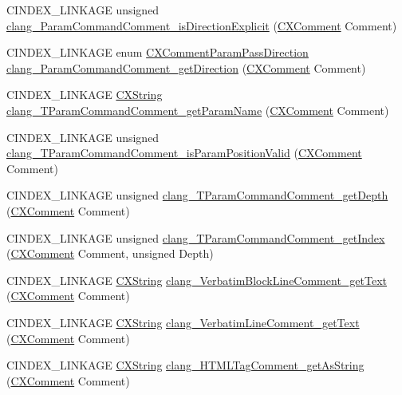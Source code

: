 \begin{DoxyCompactItemize}
\item 
C\+I\+N\+D\+E\+X\+\_\+\+L\+I\+N\+K\+A\+GE unsigned \hyperlink{group__CINDEX__COMMENT_gaf68f19e83ca9b27aec7eb22b065620bd}{clang\+\_\+\+Param\+Command\+Comment\+\_\+is\+Direction\+Explicit} (\hyperlink{structCXComment}{C\+X\+Comment} Comment)
\item 
C\+I\+N\+D\+E\+X\+\_\+\+L\+I\+N\+K\+A\+GE enum \hyperlink{group__CINDEX__COMMENT_gafadf6e52217ea74d1a014198df656ee1}{C\+X\+Comment\+Param\+Pass\+Direction} \hyperlink{group__CINDEX__COMMENT_gac78b84734e9e6040a001a0036e6aa15c}{clang\+\_\+\+Param\+Command\+Comment\+\_\+get\+Direction} (\hyperlink{structCXComment}{C\+X\+Comment} Comment)
\item 
C\+I\+N\+D\+E\+X\+\_\+\+L\+I\+N\+K\+A\+GE \hyperlink{structCXString}{C\+X\+String} \hyperlink{group__CINDEX__COMMENT_ga01f61f1d0dabcaf806eb1b9f21e5e340}{clang\+\_\+\+T\+Param\+Command\+Comment\+\_\+get\+Param\+Name} (\hyperlink{structCXComment}{C\+X\+Comment} Comment)
\item 
C\+I\+N\+D\+E\+X\+\_\+\+L\+I\+N\+K\+A\+GE unsigned \hyperlink{group__CINDEX__COMMENT_ga1f6e7538a646824f3dde65d634de753f}{clang\+\_\+\+T\+Param\+Command\+Comment\+\_\+is\+Param\+Position\+Valid} (\hyperlink{structCXComment}{C\+X\+Comment} Comment)
\item 
C\+I\+N\+D\+E\+X\+\_\+\+L\+I\+N\+K\+A\+GE unsigned \hyperlink{group__CINDEX__COMMENT_ga88371156eeeb768d0d14eb5630b7c726}{clang\+\_\+\+T\+Param\+Command\+Comment\+\_\+get\+Depth} (\hyperlink{structCXComment}{C\+X\+Comment} Comment)
\item 
C\+I\+N\+D\+E\+X\+\_\+\+L\+I\+N\+K\+A\+GE unsigned \hyperlink{group__CINDEX__COMMENT_ga0b91d26f02a476076b6dc5b5eea59a8f}{clang\+\_\+\+T\+Param\+Command\+Comment\+\_\+get\+Index} (\hyperlink{structCXComment}{C\+X\+Comment} Comment, unsigned Depth)
\item 
C\+I\+N\+D\+E\+X\+\_\+\+L\+I\+N\+K\+A\+GE \hyperlink{structCXString}{C\+X\+String} \hyperlink{group__CINDEX__COMMENT_ga599fad38a1c52917a2458ac10412969f}{clang\+\_\+\+Verbatim\+Block\+Line\+Comment\+\_\+get\+Text} (\hyperlink{structCXComment}{C\+X\+Comment} Comment)
\item 
C\+I\+N\+D\+E\+X\+\_\+\+L\+I\+N\+K\+A\+GE \hyperlink{structCXString}{C\+X\+String} \hyperlink{group__CINDEX__COMMENT_ga4eb1de9012b525f14051409427bd8eb2}{clang\+\_\+\+Verbatim\+Line\+Comment\+\_\+get\+Text} (\hyperlink{structCXComment}{C\+X\+Comment} Comment)
\item 
C\+I\+N\+D\+E\+X\+\_\+\+L\+I\+N\+K\+A\+GE \hyperlink{structCXString}{C\+X\+String} \hyperlink{group__CINDEX__COMMENT_ga684a46f5993fe907016aba5dbe9d1d9e}{clang\+\_\+\+H\+T\+M\+L\+Tag\+Comment\+\_\+get\+As\+String} (\hyperlink{structCXComment}{C\+X\+Comment} Comment)

\end{DoxyCompactItemize}
